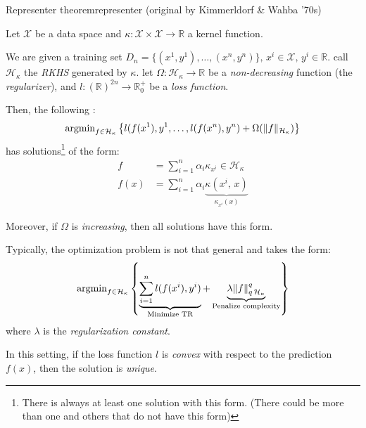 
\begin{theorem}{Representer theorem}{representer}
	(original by Kimmerldorf \& Wahba '70s)

	Let $\mathcal X$ be a data space and
	$\kappa : \mathcal X \times \mathcal X \to \mathds R$ a kernel function.

	We are given a training set $D_n =\{(x^1, y^1), \dots, (x^n, y^n)\},\,
		x^i \in \mathcal X,\, y^i \in \mathds R$.
	call $\mathcal H_\kappa$ the \emph{RKHS} generated by $\kappa$.
	let $\Omega: \mathcal H_\kappa \to \mathds R$ be a \emph{non-decreasing}
	function (the \emph{regularizer}), and
	$l: (\mathds R)^{2n} \to \mathds R^+_0$ be a \emph{loss function}.

	Then, the following :
	\begin{align*}
		\operatorname{argmin}_{f \in \mathcal H_\kappa}
		\left\{
		l(f(x^1), y^1 , \ldots , l(f(x^n), y^n) + \Omega(\lVert f \rVert_{\mathcal H_\kappa})
		\right\}
	\end{align*}
	has solutions\footnote{There is always at least one solution with this form. (There could be more than one and others that do not have this form)} of the form:
	\begin{align*}
		f    & = \sum_{i=1}^n \alpha_i \kappa_{x^i} \in \mathcal H_\kappa \\
		f(x) & = \sum_{i=1}^n \alpha_i
		\underbrace{\kappa(x^i,\, x)}_{\kappa_{x^i}(x)}
	\end{align*}

	Moreover, if $\Omega$ is \emph{increasing}, then all solutions have
	this form.

	\begin{note}
		Typically, the optimization problem is not that general and takes
		the form:
		\begin{equation*}
			\operatorname{argmin}_{f \in \mathcal H_\kappa} \left\{
			\underbrace{\sum_{i=1}^n l(f(x^i), y^i)}_{\text{Minimize TR}} +
			\underbrace{\lambda \lVert f \rVert_{q\,\mathcal H_\kappa}^q}_{\text{Penalize complexity}}
			\right\}
		\end{equation*}
		where $\lambda$ is the \emph{regularization constant}.

		\tcbline

		In this setting, if the loss function $l$ is \emph{convex}
		with respect to the prediction $f(x)$, then the solution is
		\emph{unique}.
	\end{note}

\end{theorem}

